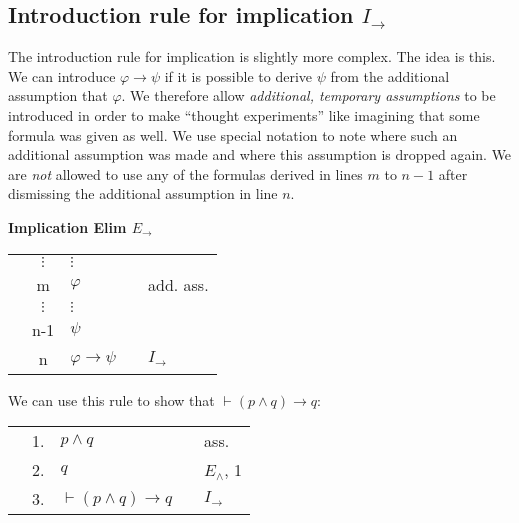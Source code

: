 \documentclass[nobib,nofonts]{tufte-handout}
\begin{document}
\subsection{Introduction rule for implication $I_{\rightarrow}$}

The introduction rule for implication is slightly more complex.
The idea is this.
We can introduce $\varphi \rightarrow \psi$ if it is possible to derive $\psi$ from the additional assumption that $\varphi$.
We therefore allow \emph{additional, temporary assumptions} to be introduced in order to make ``thought experiments'' like imagining that some formula was given as well.
We use special notation to note where such an additional assumption was made and where this assumption is dropped again.
We are \emph{not} allowed to use any of the formulas derived in lines $m$ to $n-1$ after dismissing the additional assumption in line $n$.

\bigskip
\noindent \colorbox{mygray!60}{\centering
  \begin{minipage}[t]{0.35\linewidth}
    \textbf{Implication Elim $E_{\rightarrow}$}
  \end{minipage}
  \begin{minipage}[t]{0.55\linewidth}
    \begin{tabular}{cclcl}
                         & $\vdots$  & $\vdots$                   & \\
      \cline{1-2} \vline & m         & $\varphi$                  & & add. ass.  \\
      \vline             & $ \vdots$ & $\vdots$                   & \\
      \vline             & n-1       & $\psi$                     & & \\ \hline
                         & n         & $\varphi \rightarrow \psi$ & & $I_{\rightarrow}$
    \end{tabular}
  \end{minipage}
}
\bigskip

We can use this rule to show that $\vdash (p \wedge q) \rightarrow q$:

\begin{tabular}{cclcl}
   \cline{1-2} \vline & 1. & $p \wedge q$                        & & ass.  \\
   \vline             & 2. & $q$                                 & & $E_{\wedge}$, 1 \\ \hline
                      & 3. & $\vdash (p \wedge q) \rightarrow q$ & & $I_{\rightarrow}$ \\
\end{tabular}
\end{document}
